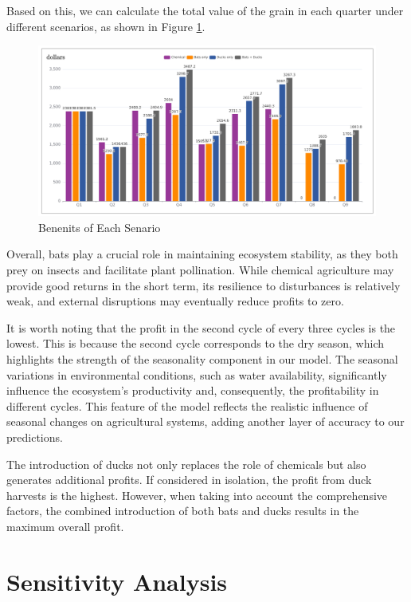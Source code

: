 \documentclass{HZNUMCM}
\begin{document}
        Based on this, we can calculate the total value of the grain in each quarter under different scenarios, 
        as shown in Figure \ref{fig:Benefits}.
        \begin{figure}
          \centering
          \includegraphics[width=\linewidth]{images/benefits_processed.png}
          \caption{Benenits of Each Senario}
          \label{fig:Benefits}
        \end{figure}
        Overall, bats play a crucial role in maintaining ecosystem stability, 
        as they both prey on insects and facilitate plant pollination. 
        While chemical agriculture may provide good returns in the short term, 
        its resilience to disturbances is relatively weak, 
        and external disruptions may eventually reduce profits to zero. 

        It is worth noting that the profit in the second cycle of every three cycles is the lowest. This is because the second cycle corresponds to the dry season, which highlights the strength of the seasonality component in our model. The seasonal variations in environmental conditions, such as water availability, significantly influence the ecosystem's productivity and, consequently, the profitability in different cycles. This feature of the model reflects the realistic influence of seasonal changes on agricultural systems, adding another layer of accuracy to our predictions.

        The introduction of ducks not only replaces the role of chemicals but also generates additional profits. 
        If considered in isolation, the profit from duck harvests is the highest. 
        However, when taking into account the comprehensive factors, 
        the combined introduction of both bats and ducks results in the maximum overall profit.
        

  \section{Sensitivity Analysis}
\end{document}

